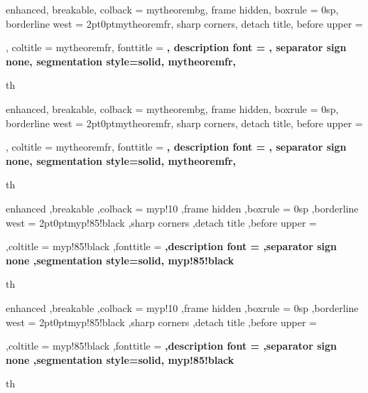 \newcommand{\point}[1]{\underline{\hat{#1}}}


\setlength{\parindent}{0cm} %





{%
	enhanced,
	breakable,
	colback = mytheorembg,
	frame hidden,
	boxrule = 0sp,
	borderline west = {2pt}{0pt}{mytheoremfr},
	sharp corners,
	detach title,
	before upper = \tcbtitle\par\smallskip,
	coltitle = mytheoremfr,
	fonttitle = \bfseries\sffamily,
	description font = \mdseries,
	separator sign none,
	segmentation style={solid, mytheoremfr},
}
{th}

{%
	enhanced,
	breakable,
	colback = mytheorembg,
	frame hidden,
	boxrule = 0sp,
	borderline west = {2pt}{0pt}{mytheoremfr},
	sharp corners,
	detach title,
	before upper = \tcbtitle\par\smallskip,
	coltitle = mytheoremfr,
	fonttitle = \bfseries\sffamily,
	description font = \mdseries,
	separator sign none,
	segmentation style={solid, mytheoremfr},
}
{th}




{%
	enhanced
	,breakable
	,colback = myp!10
	,frame hidden
	,boxrule = 0sp
	,borderline west = {2pt}{0pt}{myp!85!black}
	,sharp corners
	,detach title
	,before upper = \tcbtitle\par\smallskip
	,coltitle = myp!85!black
	,fonttitle = \bfseries\sffamily
	,description font = \mdseries
	,separator sign none
	,segmentation style={solid, myp!85!black}
}
{th}
{%
	enhanced
	,breakable
	,colback = myp!10
	,frame hidden
	,boxrule = 0sp
	,borderline west = {2pt}{0pt}{myp!85!black}
	,sharp corners
	,detach title
	,before upper = \tcbtitle\par\smallskip
	,coltitle = myp!85!black
	,fonttitle = \bfseries\sffamily
	,description font = \mdseries
	,separator sign none
	,segmentation style={solid, myp!85!black}
}
{th}


